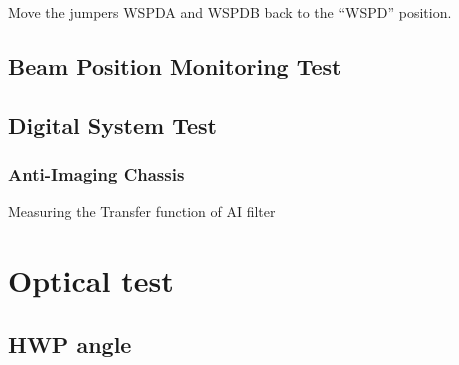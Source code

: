 \begin{enumerate}
\begin{enumerate}
		\begin{center}
		\end{center}
		Move the jumpers WSPDA and WSPDB back to the “WSPD” position.
	\end{enumerate}
\end{enumerate}
\subsection{Beam Position Monitoring Test}


\subsection{Digital System Test}
    \subsubsection{Anti-Imaging Chassis}
    Measuring the Transfer function of AI filter


\section{Optical test}
\subsection{HWP angle}
